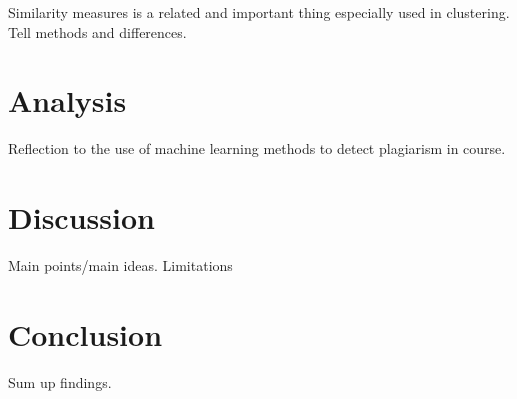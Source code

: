 \documentclass[english]{tktltiki2}
\theoremstyle{definition}
\theoremstyle{remark}
\begin{document}
Similarity measures is a related and important thing especially used in clustering. Tell methods and differences. 




\section{Analysis}
Reflection to the use of machine learning methods to detect plagiarism in course.


\section{Discussion}

Main points/main ideas. Limitations

\section{Conclusion}

Sum up findings.


%
%
%
%







% 
\end{document}
